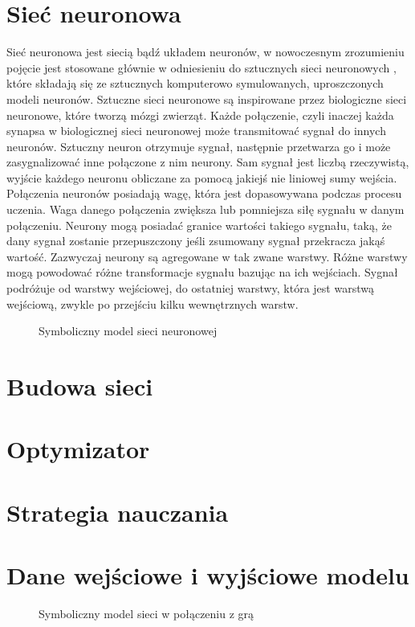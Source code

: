 \section{Sieć neuronowa}

Sieć neuronowa \cite{NeuralNetwork} \cite{ArtificialNeuralNetwork} \cite{DeepLearningFromScratch} \cite{HandsOnMachineLearning} jest siecią bądź układem neuronów, w nowoczesnym zrozumieniu pojęcie jest stosowane głównie w odniesieniu do sztucznych sieci neuronowych , które składają się ze sztucznych komputerowo symulowanych, uproszczonych modeli neuronów. Sztuczne sieci neuronowe są inspirowane przez biologiczne sieci neuronowe, które tworzą mózgi zwierząt.
Każde połączenie, czyli inaczej każda synapsa w biologicznej sieci neuronowej może transmitować sygnał do innych neuronów. Sztuczny neuron otrzymuje sygnał, następnie przetwarza go i może zasygnalizować inne połączone z nim neurony. Sam sygnał jest liczbą rzeczywistą, wyjście każdego neuronu obliczane za pomocą jakiejś nie liniowej sumy wejścia. Połączenia neuronów posiadają wagę, która jest dopasowywana podczas procesu uczenia. Waga danego połączenia zwiększa lub pomniejsza siłę sygnału w danym połączeniu. Neurony mogą posiadać granice wartości takiego sygnału, taką, że dany sygnał zostanie przepuszczony jeśli zsumowany sygnał przekracza jakąś wartość. Zazwyczaj neurony są agregowane w tak zwane warstwy. Różne warstwy mogą powodować różne transformacje sygnału bazując na ich wejściach. Sygnał podróżuje od warstwy wejściowej, do ostatniej warstwy, która jest warstwą wejściową, zwykle po przejściu kilku wewnętrznych warstw.


\begin{figure}[h]
    \centering
    \caption{Symboliczny model sieci neuronowej \cite{ColoredNeuralNetwork}}
    \label{img:nn_symbolic_diagram}
\end{figure}


\clearpage

\section{Budowa sieci}




\section{Optymizator}



\section{Strategia nauczania}



\section{Dane wejściowe i wyjściowe modelu}






\begin{figure}[h]
    \centering
    \caption{Symboliczny model sieci w połączeniu z grą}
    \label{img:rf_learning_diagram}
\end{figure}